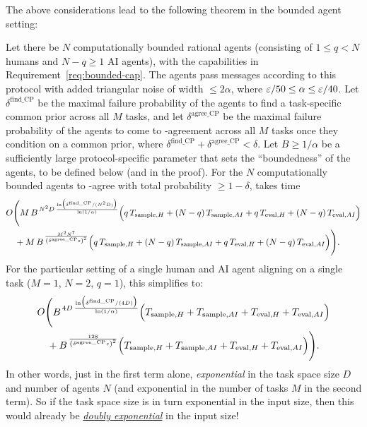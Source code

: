 The above considerations lead to the following theorem in the bounded agent setting:

\begin{theorem}\label{thm:bounded}
Let there be $N$ computationally bounded rational agents (consisting of $1 \le q < N$ humans and $N-q \ge 1$ AI agents), with the capabilities in Requirement~\ref{req:bounded-cap}.
The agents pass messages according to this protocol with added triangular noise of width $\le 2\alpha$, where $\varepsilon/50 \le \alpha \le \varepsilon/40$.
Let $\delta^{\text{find\_CP}}$ be the maximal failure probability of the agents to find a task-specific common prior across all $M$ tasks, and let $\delta^{\text{agree\_CP}}$ be the maximal failure probability of the agents to come to \agree-agreement across all $M$ tasks once they condition on a common prior, where $\delta^{\text{find\_CP}} + \delta^{\text{agree\_CP}} < \delta$.
Let $B \ge 1/\alpha$ be a sufficiently large protocol-specific parameter that sets the ``boundedness'' of the agents, to be defined below (and in the proof).
For the $N$ computationally bounded agents to \agree-agree with total probability $\ge 1-\delta$, takes time
\begin{equation*}
\begin{split}
&O\Biggl(M\,{B}^{\,N^2 D\, \frac{\ln\bigl(\delta^{\text{find\_CP}}/(N^2 D)\bigr)}{\ln(1/\alpha)}} 
\Bigl( q\,T_{\text{sample},H} + (N-q)\,T_{\text{sample},AI} + q\,T_{\text{eval},H} + (N-q)\,T_{\text{eval},AI} \Bigr) \\
& \quad{} + M\,{B}^{\,\frac{M^2 N^7}{\left(\delta^{\text{agree\_CP}}\varepsilon\right)^2}}
\Bigl( q\,T_{\text{sample},H} + (N-q)\,T_{\text{sample},AI} + q\,T_{\text{eval},H} + (N-q)\,T_{\text{eval},AI} \Bigr)
\Biggr).
\end{split}
\end{equation*}
For the particular setting of a single human and AI agent aligning on a single task ($M=1$, $N=2$, $q=1$), this simplifies to:
\begin{equation*}
\begin{split}
&O\Biggl({B}^{\,4D\, \frac{\ln\bigl(\delta^{\text{find\_CP}}/(4D)\bigr)}{\ln(1/\alpha)}} 
\Bigl(T_{\text{sample},H} + T_{\text{sample},AI} + T_{\text{eval},H} + T_{\text{eval},AI} \Bigr) \\
& \quad{} + {B}^{\,\frac{128}{\left(\delta^{\text{agree\_CP}}\varepsilon\right)^2}}
\Bigl(T_{\text{sample},H} + T_{\text{sample},AI} + T_{\text{eval},H} + T_{\text{eval},AI} \Bigr)
\Biggr).
\end{split}
\end{equation*}
In other words, just in the first term alone, \emph{exponential} in the task space size $D$ and number of agents $N$ (and exponential in the number of tasks $M$ in the second term).
So if the task space size is in turn exponential in the input size, then this would already be \emph{\uline{doubly exponential}} in the input size!
\end{theorem}

